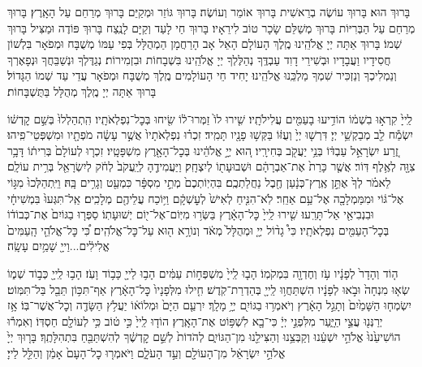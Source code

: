 \documentclass[twoside, openany, parskip=half, 11pt]{book}
\begin{document}
בָּרוּךְ הוּא׃
בָּרוּךְ עוֹשֶׂה בְרֵאשִׁית בָּרוּךְ אוֹמֵר וְעוֹשֶׂה׃
בָּרוּךְ גּוֹזֵר וּמְקַיֵּם בָּרוּךְ מְרַחֵם עַל הָאָֽרֶץ׃
בָּרוּךְ מְרַחֵם עַל הַבְּרִיּוֹת בָּרוּךְ מְשַׁלֵּם שָׂכָר טוֹב לִירֵאָיו׃
בָּרוּךְ חַי לָעַד וְקַיָּם לָנֶֽצַח בָּרוּךְ פּוֹדֶה וּמַצִּיל בָּרוּךְ שְׁמוֹ׃
בָּרוּךְ אַתָּה יְיָ אֱלֹהֵֽינוּ מֶֽלֶךְ הָעוֹלָם הָאֵל אָב הָרַחֲמָן הַמְהֻלָּל בְּפִי עַמּוֹ מְשֻׁבָּח וּמְפֹאָר בִּלְשׁוֹן חֲסִידָיו וַעֲבָדָיו וּבְשִׁירֵי דָוִד עַבְדֶּֽךָ נְהַלֶּלְךָ יְיָ אֱלֹהֵֽינוּ בִּשְׁבָחוֹת וּבִזְמִירוֹת׃ נְגַדֶּלְךָ וּנְשַׁבֵּחֲךָ וּנְפָאֶרְךָ וְנַמְלִיכְךָ וְנַזְכִּיר שִׁמְךָ מַלְכֵּֽנוּ אֱלֹהֵֽינוּ׃
יָחִיד חֵי הָעוֹלָמִים מֶֽלֶךְ מְשֻׁבָּח וּמְפֹאָר עֲדֵי עַד שְׁמוֹ הַגָּדוֹל׃ בָּרוּךְ אַתָּה יְיָ מֶֽלֶךְ מְהֻלָּל בַּתֻּשְׁבָּחוֹת׃

לַֽייָ֙ קִרְא֣וּ בִשְׁמ֔וֹ
הוֹדִ֥יעוּ בָעַמִּ֖ים עֲלִילֹתָֽיו׃
שִׁ֤ירוּ לוֹ֙ זַמְּרוּ־ל֔וֹ שִׂ֖יחוּ בְּכׇל־נִפְלְאֹתָֽיו׃
הִֽתְהַלְלוּ֙ בְּשֵׁ֣ם קׇדְשׁ֔וֹ יִשְׂמַ֕ח לֵ֖ב מְבַקְשֵׁ֥י יְיָ׃
דִּרְשׁ֤וּ יְיָ֙ וְעֻזּ֔וֹ בַּקְּשׁ֥וּ פָנָ֖יו תָּמִֽיד׃
זִכְר֗וּ נִפְלְאֹתָיו֙ אֲשֶׁ֣ר עָשָׂ֔ה מֹפְתָ֖יו וּמִשְׁפְּטֵי־פִֽיהוּ׃
זֶ֚רַע יִשְׂרָאֵ֣ל עַבְדּ֔וֹ בְּנֵ֥י יַעֲקֹ֖ב בְּחִירָֽיו׃
ה֚וּא יְיָ֣ אֱלֹהֵ֔ינוּ בְּכׇל־הָאָ֖רֶץ מִשְׁפָּטָֽיו׃
זִכְר֤וּ לְעוֹלָם֙ בְּרִית֔וֹ דָּבָ֥ר צִוָּ֖ה לְאֶ֥לֶף דּֽוֹר׃
אֲשֶׁ֤ר כָּרַת֙ אֶת־אַבְרָהָ֔ם וּשְׁבוּעָת֖וֹ לְיִצְחָֽק׃
וַיַּעֲמִידֶ֤הָ לְיַֽעֲקֹב֙ לְחֹ֔ק לְיִשְׂרָאֵ֖ל בְּרִ֥ית עוֹלָֽם׃
לֵאמֹ֗ר לְךָ֙ אֶתֵּ֣ן אֶֽרֶץ־כְּנָ֔עַן חֶ֖בֶל נַחֲלַתְכֶֽם׃
בִּהְיֽוֹתְכֶם֙ מְתֵ֣י מִסְפָּ֔ר כִּמְעַ֖ט וְגָרִ֥ים בָּֽהּ׃
וַיִּֽתְהַלְּכוּ֙ מִגּ֣וֹי אֶל־גּ֔וֹי וּמִמַּמְלָכָ֖ה אֶל־עַ֥ם אַחֵֽר׃
לֹֽא־הִנִּ֤יחַ לְאִישׁ֙ לְעׇשְׁקָ֔ם וַיּ֥וֹכַח עֲלֵיהֶ֖ם מְלָכִֽים׃
אַֽל־תִּגְּעוּ֙ בִּמְשִׁיחָ֔י וּבִנְבִיאַ֖י אַל־תָּרֵֽעוּ׃
שִׁ֤ירוּ לַֽייָ֙ כׇּל־הָאָ֔רֶץ בַּשְּׂר֥וּ מִיּֽוֹם־אֶל־י֖וֹם יְשׁוּעָתֽוֹ׃
סַפְּר֤וּ בַגּוֹיִם֙ אֶת־כְּבוֹד֔וֹ בְּכׇל־הָעַמִּ֖ים נִפְלְאֹתָֽיו׃
כִּי֩ גָד֨וֹל יְיָ֤ וּמְהֻלָּל֙ מְאֹ֔ד וְנוֹרָ֥א ה֖וּא עַל־כׇּל־אֱלֹהִֽים׃
כִּ֠י כׇּל־אֱלֹהֵ֤י הָֽעַמִּים֙ אֱלִילִ֔ים...וַייָ֖ שָׁמַ֥יִם עָשָֽׂה׃

ה֤וֹד וְהָדָר֙ לְפָנָ֔יו עֹ֥ז וְחֶדְוָ֖ה בִּמְקֹמֽוֹ׃
הָב֤וּ לַֽייָ֙ מִשְׁפְּח֣וֹת עַמִּ֔ים הָב֥וּ לַייָ֖ כָּב֥וֹד וָעֹֽז׃
הָב֥וּ לַֽייָ֖ כְּב֣וֹד שְׁמ֑וֹ שְׂא֤וּ מִנְחָה֙ וּבֹ֣אוּ לְפָנָ֔יו
הִשְׁתַּחֲו֥וּ לַֽייָ֖ בְּהַדְרַת־קֹֽדֶשׁ׃ חִ֤ילוּ מִלְּפָנָיו֙ כׇּל־הָאָ֔רֶץ
אַף־תִּכּ֥וֹן תֵּבֵ֖ל בַּל־תִּמּֽוֹט׃ יִשְׂמְח֤וּ הַשָּׁמַ֙יִם֙ וְתָגֵ֣ל הָאָ֔רֶץ
וְיֹאמְר֥וּ בַגּוֹיִ֖ם יְיָ֥ מָלָֽךְ׃ יִרְעַ֤ם הַיָּם֙ וּמְלוֹא֔וֹ
יַעֲלֹ֥ץ הַשָּׂדֶ֖ה וְכׇל־אֲשֶׁר־בּֽוֹ׃ אָ֥ז יְרַנְּנ֖וּ עֲצֵ֣י הַיָּ֑עַר
מִלִּפְנֵ֣י יְיָ֔ כִּי־בָ֖א לִשְׁפּ֥וֹט אֶת־הָאָֽרֶץ׃ הוֹד֤וּ לַֽייָ֙ כִּ֣י ט֔וֹב
כִּ֥י לְעוֹלָ֖ם חַסְדּֽוֹ׃ וְאִמְר֕וּ הוֹשִׁיעֵ֙נוּ֙ אֱלֹהֵ֣י יִשְׁעֵ֔נוּ
וְקַבְּצֵ֥נוּ וְהַצִּילֵ֖נוּ מִן־הַגּוֹיִ֑ם לְהֹדוֹת֙ לְשֵׁ֣ם קׇדְשֶׁ֔ךָ
לְהִשְׁתַּבֵּ֖חַ בִּתְהִלָּתֶֽךָ׃ בָּר֤וּךְ יְיָ֙ אֱלֹהֵ֣י יִשְׂרָאֵ֔ל
מִן־הָעוֹלָ֖ם וְעַ֣ד הָעֹלָ֑ם וַיֹּאמְר֤וּ כׇל־הָעָם֙ אָמֵ֔ן וְהַלֵּ֖ל לַייָ׃\\
\end{document}
